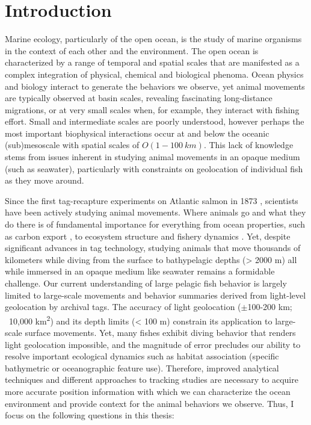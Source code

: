
\chapter{Introduction}
\raggedbottom
\clearpage


Marine ecology, particularly of the open ocean, is the study of marine organisms in the context of each other and the environment. The open ocean is characterized by a range of temporal and spatial scales that are manifested as a complex integration of physical, chemical and biological phenoma. Ocean physics and biology interact to generate the behaviors we observe, yet animal movements are typically observed at basin scales, revealing fascinating long-distance migrations, or at very small scales when, for example, they interact with fishing effort. Small and intermediate scales are poorly understood, however perhaps the most important biophysical interactions occur at and below the oceanic (sub)mesoscale with spatial scales of $O(1 - 100\ km)$. This lack of knowledge stems from issues inherent in studying animal movements in an opaque medium (such as seawater), particularly with constraints on geolocation of individual fish as they move around. 

Since the first tag-recapture experiments on Atlantic salmon in 1873 \citep{Everhart1975}, scientists have been actively studying animal movements. Where animals go and what they do there is of fundamental importance for everything from ocean properties, such as carbon export \citep[\eg][]{Lavery2010a}, to ecosystem structure \citep[\eg][]{Thorrold2014} and fishery dynamics \citep[\eg][]{Block2005}. Yet, despite significant advances in tag technology, studying animals that move thousands of kilometers while diving from the surface to bathypelagic depths (> 2000 m) all while immersed in an opaque medium like seawater remains a formidable challenge. Our current understanding of large pelagic fish behavior is largely limited to large-scale movements and behavior summaries derived from light-level geolocation by archival tags. The accuracy of light geolocation ($\pm$100-200 km; ~10,000 km\textsuperscript{2}) and its depth limits (< 100 m) constrain its application to large-scale surface movements. Yet, many fishes exhibit diving behavior that renders light geolocation impossible, and the magnitude of error precludes our ability to resolve important ecological dynamics such as habitat association (\eg specific bathymetric or oceanographic feature use). Therefore, improved analytical techniques and different approaches to tracking studies are necessary to acquire more accurate position information with which we can characterize the ocean environment and provide context for the animal behaviors we observe. Thus, I focus on the following questions in this thesis:

